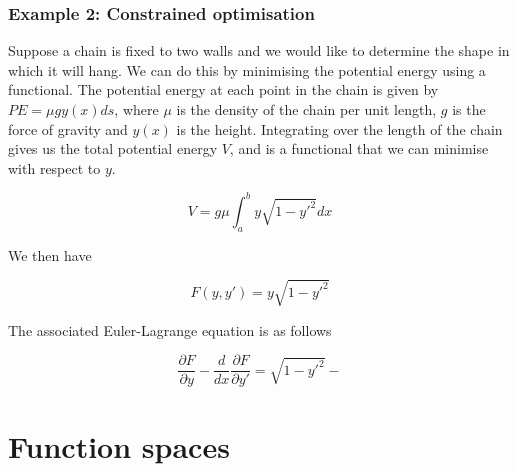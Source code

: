 \documentclass[]{article}
\begin{document}
\subsubsection{Example 2: Constrained optimisation}
Suppose a chain is fixed to two walls and we would like to determine the shape in which it will hang. We can do this by minimising the potential energy using a functional. The potential energy at each point in the chain is given by $PE = \mu gy(x) ds$, where $\mu$ is the density of the chain per unit length, $g$ is the force of gravity and $y(x)$ is the height. Integrating over the length of the chain gives us the total potential energy $V$, and is a functional that we can minimise with respect to $y$.

\begin{equation} V = g \mu \int_{a}^{b} y\sqrt{1-y'^{2}}dx \end{equation}

We then have

\begin{equation} F(y, y') = y\sqrt{1-y'^{2}}\end{equation}

The associated Euler-Lagrange equation is as follows

\begin{equation} \frac{\partial F}{\partial y} - \frac{d}{dx}\frac{\partial F}{\partial y'} = \sqrt{1-y'^{2}} -  \end{equation}


\nocite{*}



\newpage
\section{Function spaces}
\end{document}
